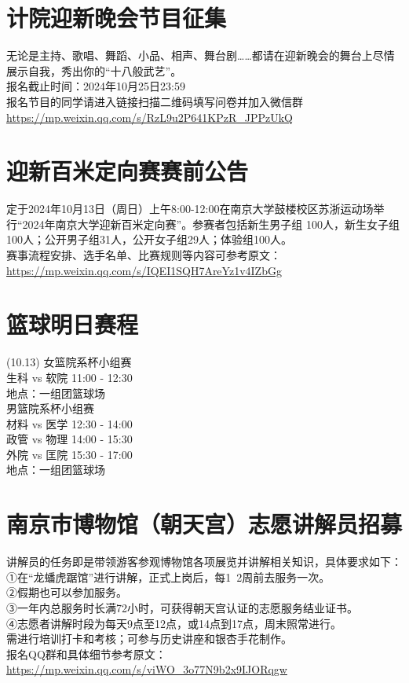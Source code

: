 \documentclass[letterpaper, 12pt]{article}
\begin{document}
\begin{multicols}{2}
\section{计院迎新晚会节目征集}
无论是主持、歌唱、舞蹈、小品、相声、舞台剧……都请在迎新晚会的舞台上尽情展示自我，秀出你的“十八般武艺”。\\
报名截止时间：2024年10月25日23:59\\
报名节目的同学请进入链接扫描二维码填写问卷并加入微信群\url{https://mp.weixin.qq.com/s/RzL9u2P641KPzR_JPPzUkQ}

\section{迎新百米定向赛赛前公告}
定于2024年10月13日（周日）上午8:00-12:00在南京大学鼓楼校区苏浙运动场举行“2024年南京大学迎新百米定向赛”。参赛者包括新生男子组 100人，新生女子组100人；公开男子组31人，公开女子组29人；体验组100人。\\
赛事流程安排、选手名单、比赛规则等内容可参考原文：\url{https://mp.weixin.qq.com/s/IQEI1SQH7AreYz1v4IZbGg}


\section{篮球明日赛程}
(10.13)
女篮院系杯小组赛\\
生科 vs 软院 11:00 - 12:30\\
地点：一组团篮球场\\
男篮院系杯小组赛\\
材料 vs 医学 12:30 - 14:00\\
政管 vs 物理 14:00 - 15:30\\
外院 vs 匡院 15:30 - 17:00\\
地点：一组团篮球场

\section{南京市博物馆（朝天宫）志愿讲解员招募}
讲解员的任务即是带领游客参观博物馆各项展览并讲解相关知识，具体要求如下：\\
①在“龙蟠虎踞馆”进行讲解，正式上岗后，每1~2周前去服务一次。\\
②假期也可以参加服务。\\
③一年内总服务时长满72小时，可获得朝天宫认证的志愿服务结业证书。\\
④志愿者讲解时段为每天9点至12点，或14点到17点，周末照常进行。\\
需进行培训打卡和考核；可参与历史讲座和银杏手花制作。\\
报名QQ群和具体细节参考原文：\url{https://mp.weixin.qq.com/s/viWO_3o77N9b2x9IJORqgw}

\end{multicols} 
\end{document}
